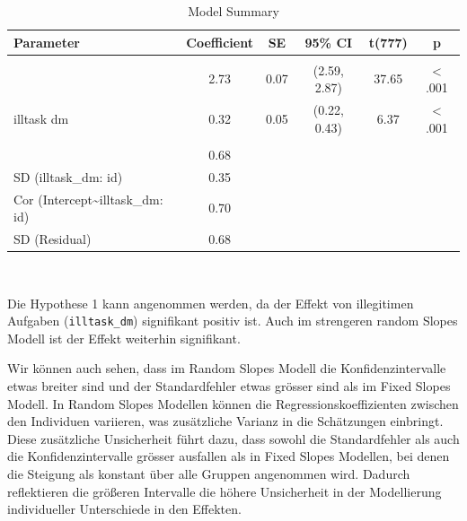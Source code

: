 \documentclass[
  letterpaper,
  DIV=11,
  numbers=noendperiod]{scrreprt}
\begin{document}
\begin{tcolorbox}
\begin{table}
\caption*{
{\large Model Summary}
} 
\fontsize{12.0pt}{14.4pt}\selectfont
\begin{tabular*}{\linewidth}{@{\extracolsep{\fill}}lccccc}
\toprule
Parameter & Coefficient & SE & 95\% CI & t(777) & p \\ 
\midrule\addlinespace[2.5pt]
\multicolumn{6}{l}{{\slshape Fixed Effects }} \\[2.5pt] 
\midrule\addlinespace[2.5pt]
{(Intercept)} & 2.73 & 0.07 & (2.59, 2.87) & 37.65 & < .001 \\ 
{illtask dm} & 0.32 & 0.05 & (0.22, 0.43) & 6.37 & < .001 \\ 
\midrule\addlinespace[2.5pt]
\multicolumn{6}{l}{{\slshape Random Effects }} \\[2.5pt] 
\midrule\addlinespace[2.5pt]
{SD (Intercept: id)} & 0.68 &  &  &  &  \\ 
{SD (illtask\_dm: id)} & 0.35 &  &  &  &  \\ 
{Cor (Intercept\textasciitilde{}illtask\_dm: id)} & 0.70 &  &  &  &  \\ 
{SD (Residual)} & 0.68 &  &  &  &  \\ 
\bottomrule
\end{tabular*}
\begin{minipage}{\linewidth}
\\
\end{minipage}
\end{table}

Die Hypothese 1 kann angenommen werden, da der Effekt von illegitimen
Aufgaben (\texttt{illtask\_dm}) signifikant positiv ist. Auch im
strengeren random Slopes Modell ist der Effekt weiterhin signifikant.

Wir können auch sehen, dass im Random Slopes Modell die
Konfidenzintervalle etwas breiter sind und der Standardfehler etwas
grösser sind als im Fixed Slopes Modell. In Random Slopes Modellen
können die Regressionskoeffizienten zwischen den Individuen variieren,
was zusätzliche Varianz in die Schätzungen einbringt. Diese zusätzliche
Unsicherheit führt dazu, dass sowohl die Standardfehler als auch die
Konfidenzintervalle grösser ausfallen als in Fixed Slopes Modellen, bei
denen die Steigung als konstant über alle Gruppen angenommen wird.
Dadurch reflektieren die größeren Intervalle die höhere Unsicherheit in
der Modellierung individueller Unterschiede in den Effekten.

\end{tcolorbox}

\end{document}
